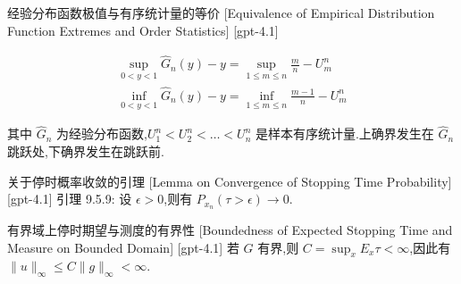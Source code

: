\documentclass[UTF8]{ctexart}
\begin{document}
    
    
    \begin{thm}
        {经验分布函数极值与有序统计量的等价}
        [Equivalence of Empirical Distribution Function Extremes and Order Statistics]
        [gpt-4.1]
        
\[
\begin{array}{l}
  \displaystyle \operatorname*{sup}_{0 < y < 1} \hat{G}_n(y) - y = \displaystyle \operatorname*{sup}_{1 \leq m \leq n} \frac{m}{n} - U_m^n \\
  \displaystyle \operatorname*{inf}_{0 < y < 1} \hat{G}_n(y) - y = \displaystyle \operatorname*{inf}_{1 \leq m \leq n} \frac{m-1}{n} - U_m^n
\end{array}
\]

其中 $\hat{G}_n$ 为经验分布函数,$U_1^n < U_2^n < \ldots < U_n^n$ 是样本有序统计量.上确界发生在 $\hat{G}_n$ 跳跃处,下确界发生在跳跃前.

    \end{thm}
    
    
    
    \begin{lma}
        {关于停时概率收敛的引理}
        [Lemma on Convergence of Stopping Time Probability]
        [gpt-4.1]
        引理 9.5.9: 设 $\epsilon > 0$,则有 $P_{x_n} (\tau > \epsilon) \to 0$.
    \end{lma}
    
    
    
    \begin{ppt}
        {有界域上停时期望与测度的有界性}
        [Boundedness of Expected Stopping Time and Measure on Bounded Domain]
        [gpt-4.1]
        若 $G$ 有界,则 $C = \sup_x E_x \tau < \infty$,因此有 $\|
u\|_{\infty} \leq C \|g\|_{\infty} < \infty$.
    \end{ppt}
    
    
    
\end{document}
